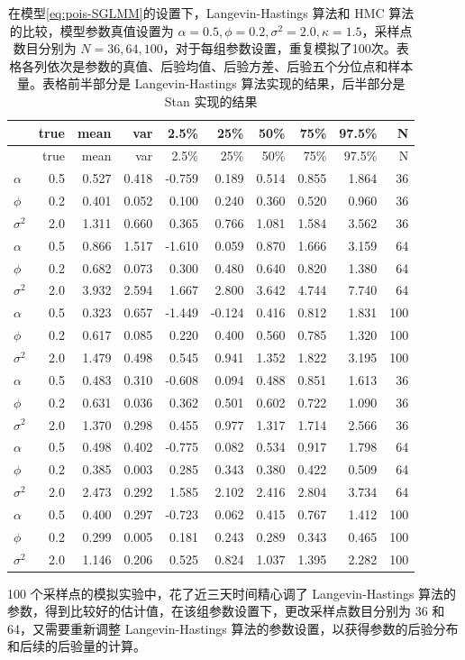\documentclass[12pt,a4paper,UTF8,twoside]{book}
\theoremstyle{definition}
\theoremstyle{definition}
\theoremstyle{definition}
\theoremstyle{remark}
\begin{document}
\begin{longtable}[]{@{}lrrrrrrrrr@{}}
\caption{\label{tab:Pois-MCLV-vs-NUTS}
在模型\eqref{eq:pois-SGLMM}的设置下，Langevin-Hastings 算法和 HMC
算法的比较，模型参数真值设置为
\(\alpha = 0.5, \phi = 0.2, \sigma^2 = 2.0, \kappa = 1.5\)，采样点数目分别为
\(N=36,64,100\)，对于每组参数设置，重复模拟了100次。表格各列依次是参数的真值、后验均值、后验方差、后验五个分位点和样本量。表格前半部分是
Langevin-Hastings 算法实现的结果，后半部分是 Stan
实现的结果}\tabularnewline
\toprule
& true & mean & var & 2.5\% & 25\% & 50\% & 75\% & 97.5\% &
N\tabularnewline
\midrule
\endfirsthead
\toprule
& true & mean & var & 2.5\% & 25\% & 50\% & 75\% & 97.5\% &
N\tabularnewline
\midrule
\endhead
\(\alpha\) & 0.5 & 0.527 & 0.418 & -0.759 & 0.189 & 0.514 & 0.855 &
1.864 & 36\tabularnewline
\(\phi\) & 0.2 & 0.401 & 0.052 & 0.100 & 0.240 & 0.360 & 0.520 & 0.960 &
36\tabularnewline
\(\sigma^2\) & 2.0 & 1.311 & 0.660 & 0.365 & 0.766 & 1.081 & 1.584 &
3.562 & 36\tabularnewline
\(\alpha\) & 0.5 & 0.866 & 1.517 & -1.610 & 0.059 & 0.870 & 1.666 &
3.159 & 64\tabularnewline
\(\phi\) & 0.2 & 0.682 & 0.073 & 0.300 & 0.480 & 0.640 & 0.820 & 1.380 &
64\tabularnewline
\(\sigma^2\) & 2.0 & 3.932 & 2.594 & 1.667 & 2.800 & 3.642 & 4.744 &
7.740 & 64\tabularnewline
\(\alpha\) & 0.5 & 0.323 & 0.657 & -1.449 & -0.124 & 0.416 & 0.812 &
1.831 & 100\tabularnewline
\(\phi\) & 0.2 & 0.617 & 0.085 & 0.220 & 0.400 & 0.560 & 0.785 & 1.320 &
100\tabularnewline
\(\sigma^2\) & 2.0 & 1.479 & 0.498 & 0.545 & 0.941 & 1.352 & 1.822 &
3.195 & 100\tabularnewline
\(\alpha\) & 0.5 & 0.483 & 0.310 & -0.608 & 0.094 & 0.488 & 0.851 &
1.613 & 36\tabularnewline
\(\phi\) & 0.2 & 0.631 & 0.036 & 0.362 & 0.501 & 0.602 & 0.722 & 1.090 &
36\tabularnewline
\(\sigma^2\) & 2.0 & 1.370 & 0.298 & 0.455 & 0.977 & 1.317 & 1.714 &
2.566 & 36\tabularnewline
\(\alpha\) & 0.5 & 0.498 & 0.402 & -0.775 & 0.082 & 0.534 & 0.917 &
1.798 & 64\tabularnewline
\(\phi\) & 0.2 & 0.385 & 0.003 & 0.285 & 0.343 & 0.380 & 0.422 & 0.509 &
64\tabularnewline
\(\sigma^2\) & 2.0 & 2.473 & 0.292 & 1.585 & 2.102 & 2.416 & 2.804 &
3.734 & 64\tabularnewline
\(\alpha\) & 0.5 & 0.400 & 0.297 & -0.723 & 0.062 & 0.415 & 0.767 &
1.412 & 100\tabularnewline
\(\phi\) & 0.2 & 0.299 & 0.005 & 0.181 & 0.243 & 0.289 & 0.343 & 0.465 &
100\tabularnewline
\(\sigma^2\) & 2.0 & 1.146 & 0.206 & 0.525 & 0.824 & 1.037 & 1.395 &
2.282 & 100\tabularnewline
\bottomrule
\end{longtable}

100 个采样点的模拟实验中，花了近三天时间精心调了 Langevin-Hastings
算法的参数，得到比较好的估计值，在该组参数设置下，更改采样点数目分别为
36 和 64，又需要重新调整 Langevin-Hastings
算法的参数设置，以获得参数的后验分布和后续的后验量的计算。
\end{document}
